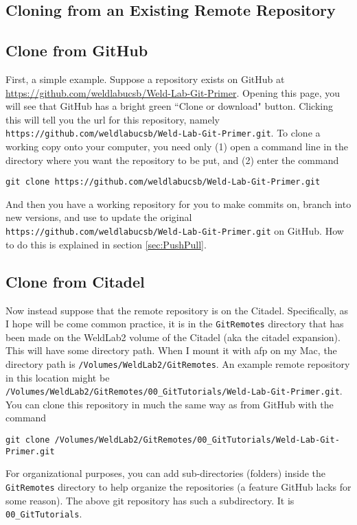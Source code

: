 \documentclass[11pt]{article}
\newcommand{\code}[1]{\begin{adjustwidth}{0.5in}{0in}
    \texttt{#1}
    \end{adjustwidth}}
\begin{document}
\subsection{Cloning from an Existing Remote Repository}

\subsection{Clone from GitHub}
First, a simple example.  Suppose a repository exists on GitHub at \newline\url{https://github.com/weldlabucsb/Weld-Lab-Git-Primer}.  Opening this page, you will see that GitHub has a bright green ``Clone or download" button.  Clicking this will tell you the url for this repository, namely \texttt{https://github.com/weldlabucsb/Weld-Lab-Git-Primer.git}.  To clone a working copy onto your computer, you need only (1) open a command line in the directory where you want the repository to be put, and (2) enter the command

\code{git clone https://github.com/weldlabucsb/Weld-Lab-Git-Primer.git}

And then you have a working repository for you to make commits on, branch into new versions, and use to update the original \texttt{https://github.com/weldlabucsb/Weld-Lab-Git-Primer.git} on GitHub.  How to do this is explained in section \ref{sec:PushPull}.

\subsection{Clone from Citadel}
Now instead suppose that the remote repository is on the Citadel.  Specifically, as I hope will be come common practice, it is in the \texttt{GitRemotes} directory that has been made on the WeldLab2 volume of the Citadel (aka the citadel expansion).  This will have some directory path.  When I mount it with afp on my Mac, the directory path is \texttt{/Volumes/WeldLab2/GitRemotes}.  An example remote repository in this location might be\\ 
\texttt{/Volumes/WeldLab2/GitRemotes/00\_GitTutorials/Weld-Lab-Git-Primer.git}.  You can clone this repository in much the same way as from GitHub with the command

\begin{center}
\texttt{git clone /Volumes/WeldLab2/GitRemotes/00\_GitTutorials/Weld-Lab-Git-Primer.git}
\end{center}

For organizational purposes, you can add sub-directories (folders) inside the \texttt{GitRemotes} directory to help organize the repositories (a feature GitHub lacks for some reason).  The above git repository has such a subdirectory.  It is \texttt{00\_GitTutorials}.
\end{document}
